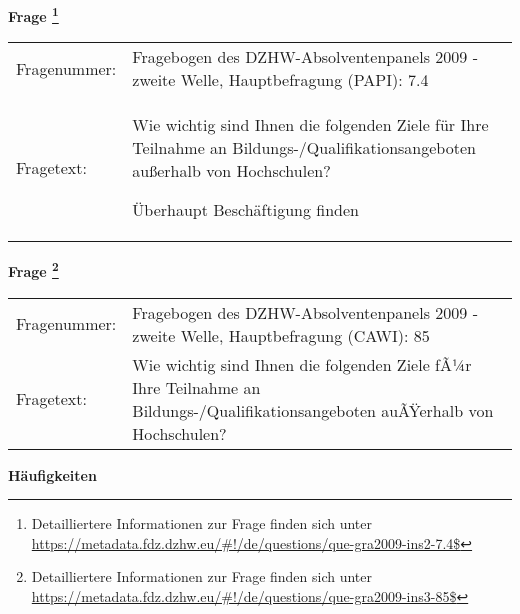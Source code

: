 				\vspace*{0.5cm}
                \noindent\textbf{Frage
	                \footnote{Detailliertere Informationen zur Frage finden sich unter
		              \url{https://metadata.fdz.dzhw.eu/\#!/de/questions/que-gra2009-ins2-7.4$}}}\\
				\begin{tabularx}{\hsize}{@{}lX}
					Fragenummer: &
					  Fragebogen des DZHW-Absolventenpanels 2009 - zweite Welle, Hauptbefragung (PAPI):
					  7.4
 \\
					Fragetext: & Wie wichtig sind Ihnen die folgenden Ziele für Ihre Teilnahme an Bildungs-/Qualifikationsangeboten außerhalb von Hochschulen?\par  Überhaupt Beschäftigung finden \\
				\end{tabularx}
				\vspace*{0.5cm}
                \noindent\textbf{Frage
	                \footnote{Detailliertere Informationen zur Frage finden sich unter
		              \url{https://metadata.fdz.dzhw.eu/\#!/de/questions/que-gra2009-ins3-85$}}}\\
				\begin{tabularx}{\hsize}{@{}lX}
					Fragenummer: &
					  Fragebogen des DZHW-Absolventenpanels 2009 - zweite Welle, Hauptbefragung (CAWI):
					  85
 \\
					Fragetext: & Wie wichtig sind Ihnen die folgenden Ziele fÃ¼r Ihre Teilnahme an Bildungs-/Qualifikationsangeboten auÃŸerhalb von Hochschulen? \\
				\end{tabularx}





        		\vspace*{0.5cm}
                \noindent\textbf{Häufigkeiten}

